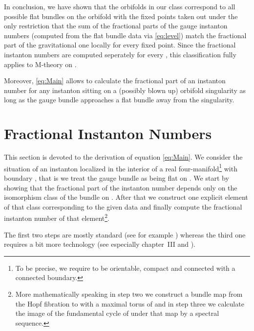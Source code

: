 \documentclass[a4paper,12pt,twoside]{article}
\numberwithin{equation}{section}
\providecommand{\pE}{\text{E}  }     %
\providecommand{\mC}{\mathbb{C}}
\providecommand{\mZ}{\mathbb{Z}}
\providecommand{\lauf}{\longrightarrow}
\begin{document}
In conclusion, we have shown that the orbifolds in our class
correspond to all possible flat \myHighlight{$\pE_8 \times \pE_8$}\coordHE{} bundles on the
orbifold \myHighlight{$\mC^2/S$}\coordHE{} with the fixed points taken out under the only
restriction that the sum of the fractional parts of the gauge
instanton numbers (computed from the flat bundle data via
\eqref{eq:level}) match the fractional part of the gravitational one
locally for every fixed point. Since the fractional instanton numbers
are computed seperately for every \myHighlight{$\pE_8$}\coordHE{}, this classification fully
applies to M-theory on \myHighlight{$S^1/\mZ_2$}\coordHE{}.

Moreover, \eqref{eq:Main} allows to calculate the fractional part of
an \myHighlight{$\pE_8$}\coordHE{} instanton number for any instanton sitting on a (possibly
blown up) orbifold singularity as long as the gauge bundle approaches
a flat bundle away from the singularity.



\section{Fractional Instanton Numbers}
\label{Calc}


This section is devoted to the derivation of equation \eqref{eq:Main}.
We consider the situation of an \myHighlight{$\pE_8$}\coordHE{} instanton localized in the
interior of a real four-manifold\footnote{%
  To be precise, we require \coordHE{} to be orientable, compact and
  connected with a connected boundary.  } \coordHE{} with boundary \coordHE{}, that
is we treat the gauge bundle as being flat on \coordHE{}. We start by showing
that the fractional part of the instanton number depends only on the
isomorphism class of the bundle on \coordHE{}. After that we construct one
explicit element of that class corresponding to the given data and
finally compute the fractional instanton number of that
element\footnote{%
  More mathematically speaking in step two we construct a bundle map
  from the Hopf fibration \myHighlight{$S^3 \lauf S^2$}\coordHE{} to \myHighlight{$\pE_8 \lauf \pE_8/T^8$}\coordHE{}
  with \coordHE{} a maximal torus of \myHighlight{$\pE_8$}\coordHE{} and in step three we calculate
  the image of the fundamental cycle of \coordHE{} under that map by a
  spectral sequence.}.

The first two steps are mostly standard (see for example
\cite{Spanier, Steenrod}) whereas the third one requires a bit more
technology (see especially \cite{BottTu} chapter~III and \cite{Bott}).
\end{document}
